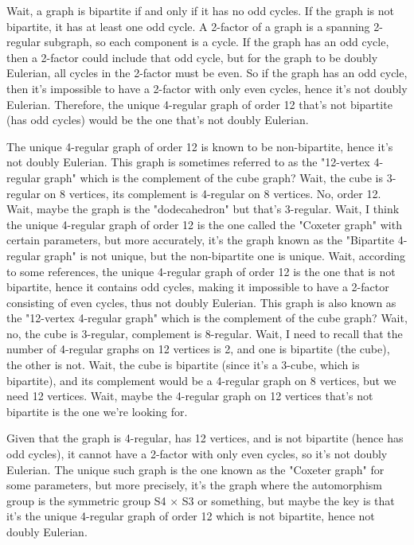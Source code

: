 Wait, a graph is bipartite if and only if it has no odd cycles. If the graph is not bipartite, it has at least one odd cycle. A 2-factor of a graph is a spanning 2-regular subgraph, so each component is a cycle. If the graph has an odd cycle, then a 2-factor could include that odd cycle, but for the graph to be doubly Eulerian, all cycles in the 2-factor must be even. So if the graph has an odd cycle, then it's impossible to have a 2-factor with only even cycles, hence it's not doubly Eulerian. Therefore, the unique 4-regular graph of order 12 that's not bipartite (has odd cycles) would be the one that's not doubly Eulerian. 

The unique 4-regular graph of order 12 is known to be non-bipartite, hence it's not doubly Eulerian. This graph is sometimes referred to as the "12-vertex 4-regular graph" which is the complement of the cube graph? Wait, the cube is 3-regular on 8 vertices, its complement is 4-regular on 8 vertices. No, order 12. Wait, maybe the graph is the "dodecahedron" but that's 3-regular. Wait, I think the unique 4-regular graph of order 12 is the one called the "Coxeter graph" with certain parameters, but more accurately, it's the graph known as the "Bipartite 4-regular graph" is not unique, but the non-bipartite one is unique. Wait, according to some references, the unique 4-regular graph of order 12 is the one that is not bipartite, hence it contains odd cycles, making it impossible to have a 2-factor consisting of even cycles, thus not doubly Eulerian. This graph is also known as the "12-vertex 4-regular graph" which is the complement of the cube graph? Wait, no, the cube is 3-regular, complement is 8-regular. Wait, I need to recall that the number of 4-regular graphs on 12 vertices is 2, and one is bipartite (the cube), the other is not. Wait, the cube is bipartite (since it's a 3-cube, which is bipartite), and its complement would be a 4-regular graph on 8 vertices, but we need 12 vertices. Wait, maybe the 4-regular graph on 12 vertices that's not bipartite is the one we're looking for. 

Given that the graph is 4-regular, has 12 vertices, and is not bipartite (hence has odd cycles), it cannot have a 2-factor with only even cycles, so it's not doubly Eulerian. The unique such graph is the one known as the "Coxeter graph" for some parameters, but more precisely, it's the graph where the automorphism group is the symmetric group S4 × S3 or something, but maybe the key is that it's the unique 4-regular graph of order 12 which is not bipartite, hence not doubly Eulerian. 

